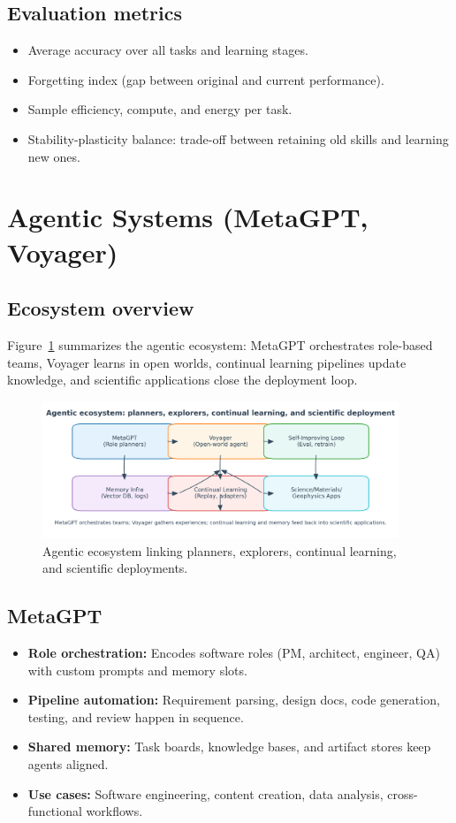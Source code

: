 \documentclass{article}
\begin{document}
\subsection{Evaluation metrics}
\begin{itemize}
  \item Average accuracy over all tasks and learning stages.
  \item Forgetting index (gap between original and current performance).
  \item Sample efficiency, compute, and energy per task.
  \item Stability-plasticity balance: trade-off between retaining old skills and learning new ones.
\end{itemize}

\section{Agentic Systems (MetaGPT, Voyager)}
\subsection{Ecosystem overview}
Figure~\ref{fig:agentic_ecosystem_en} summarizes the agentic ecosystem: MetaGPT orchestrates role-based teams, Voyager learns in open worlds, continual learning pipelines update knowledge, and scientific applications close the deployment loop.
\begin{figure}[H]
  \centering
  \includegraphics[width=0.95\textwidth]{agentic_ecosystem.png}
  \caption{Agentic ecosystem linking planners, explorers, continual learning, and scientific deployments.}
  \label{fig:agentic_ecosystem_en}
\end{figure}

\subsection{MetaGPT}
\begin{itemize}
  \item \textbf{Role orchestration:} Encodes software roles (PM, architect, engineer, QA) with custom prompts and memory slots.
  \item \textbf{Pipeline automation:} Requirement parsing, design docs, code generation, testing, and review happen in sequence.
  \item \textbf{Shared memory:} Task boards, knowledge bases, and artifact stores keep agents aligned.
  \item \textbf{Use cases:} Software engineering, content creation, data analysis, cross-functional workflows.
\end{itemize}
\end{document}
